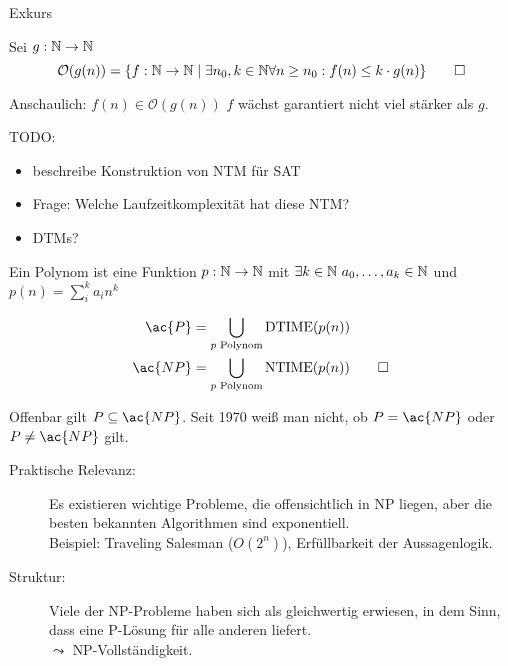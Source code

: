 {\color{red}


Exkurs
\begin{Def} Sei $g:\mathbb{N}\rightarrow\mathbb{N}$
\[ \mathcal{O}(g(n)) = \{f:\mathbb{N}\rightarrow\mathbb{N} \mid \exists n_0, k\in\mathbb{N} \forall n\geq n_0: f(n)\leq k\cdot g(n)\} \qedhere \]
\end{Def}

Anschaulich: $f(n)\in \mathcal{O}(g(n))$ $f$ wächst garantiert nicht viel stärker als $g$.


TODO: 

\begin{itemize}
 \item beschreibe Konstruktion von \ac{NTM} für \ac{SAT}
 \item Frage: Welche Laufzeitkomplexität hat diese \ac{NTM}?
 \item \ac{DTM}s?
\end{itemize}


\begin{Def}[name={[Polynom]}]
	Ein Polynom ist eine Funktion $p:\N\->\N$ mit $\exists k\in \mathbb{N}\ a_0,\dots,a_k\in\mathbb{N}$ und \mbox{$p(n)=\sum_i^k a_in^k$}
\end{Def}
\begin{Def}
 \begin{align*}
  \ac{P} &= \bigcup_{p\text{ Polynom}} \DTIME(p(n)) \\
  \ac{NP} &= \bigcup_{p\text{ Polynom}} \NTIME(p(n))
  \qedhere
 \end{align*}
\end{Def}



Offenbar gilt $P\subseteq \ac{NP}$. Seit 1970 weiß man nicht, ob $P=\ac{NP}$ oder $P\neq \ac{NP}$ gilt.
\begin{description}
\item[Praktische Relevanz:] Es existieren wichtige Probleme, die offensichtlich in \ac{NP} liegen, aber die besten bekannten Algorithmen sind exponentiell.\\
	Beispiel: Traveling Salesman ($O(2^n)$), Erfüllbarkeit der Aussagenlogik.
\item[Struktur:] Viele der \ac{NP}-Probleme haben sich als gleichwertig erwiesen, in dem Sinn, dass eine \ac{P}-Lösung für alle anderen liefert.\\
	$\leadsto$ \ac{NP}-Vollständigkeit.
\end{description}
}

